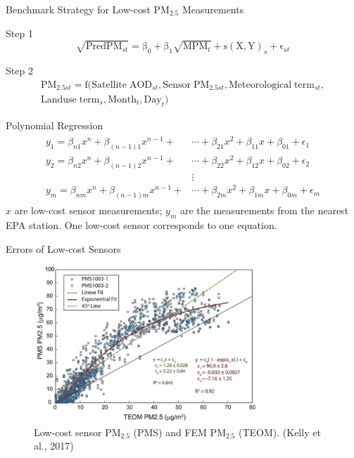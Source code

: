 \documentclass{beamer}
\begin{document}
\begin{frame}{Benchmark Strategy for Low-cost PM$_{2.5}$ Measurements}
    \begin{block}{Step 1}
            \begin{equation*}
        \mathrm{\sqrt{PredPM_\mathit{st}}=\beta_0+\beta_1 \sqrt{MPM_\mathit{t}}+s(X,Y)_\mathit{s}+\epsilon_\mathit{st}}
    \end{equation*}
    \end{block}
    \begin{block}{Step 2}
        \begin{align*}
        \mathrm{PM_{2.5\mathit{st}}=f(Satellite\;AOD_{\mathit{st}},Sensor\;PM_{2.5\mathit{st}},Meteorological\;term_{\mathit{st}},}\\
        \mathrm{Landuse\;term_\mathit{s},Month_\mathit{t}, Day_\mathit{t})}
        \end{align*}
    \end{block}
\end{frame}

\begin{frame}{Polynomial Regression}
    \begin{align*}
        \begin{split}
        y_1=\beta_{n1}x^n+\beta_{(n-1)1}x^{n-1}+&\cdots+\beta_{21}x^2+\beta_{11}x+\beta_{01} + \epsilon_1 \\
        y_2=\beta_{n2}x^n+\beta_{(n-1)2}x^{n-1}+&\cdots+\beta_{22}x^2+\beta_{12}x+\beta_{02} + \epsilon_2 \\
        &\vdots \\
        y_m=\beta_{nm}x^n+\beta_{(n-1)m}x^{n-1}+&\cdots+\beta_{2m}x^2+\beta_{1m}x+\beta_{0m} + \epsilon_m
        \end{split}
    \end{align*}
    \textcolor[rgb]{0.1,0.1,0.6}{$x$ are low-cost sensor measurements; $y_m$ are the measurements from the nearest EPA station. One low-cost sensor corresponds to one equation.}
\end{frame}

\begin{frame}{Errors of Low-cost Sensors}
    \label{frm:error}
    \begin{figure}
        \centering
        \includegraphics[width=0.75\textwidth]{img/appendix/Aim2/kelly2017.png}
        \caption{Low-cost sensor PM$_{2.5}$ (PMS) and FEM PM$_{2.5}$ (TEOM). (Kelly et al., 2017)}
    \end{figure}
\end{frame}
\end{document}
